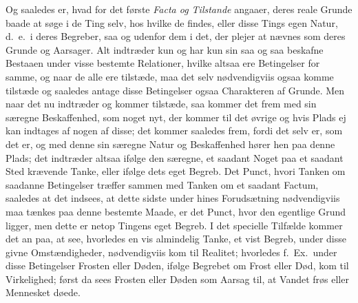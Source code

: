 \documentclass[12pt,a4paper]{book}
\newcommand{\apage}[1]{\marginnote{\footnotesize\textit{[#1]}}}
\begin{document}
Og saaledes er, hvad for det første \emph{Facta og Tilstande} angaaer, deres reale
Grunde baade at søge i de Ting selv, hos hvilke de findes, eller disse Tings egen
Natur, d.\ e.\ i deres Begreber, saa og udenfor dem i det, der plejer at nævnes
som deres Grunde og Aarsager. Alt indtræder kun og har kun sin saa og saa beskafne
Bestaaen under visse bestemte Relationer, hvilke altsaa ere Betingelser for samme,
og naar de alle ere tilstæde, maa det selv nødvendigviis ogsaa komme tilstæde og
saaledes antage disse Betingelser ogsaa Charakteren af Grunde. Men naar det nu
indtræder og kommer tilstæde, saa kommer det frem med sin særegne Beskaffenhed,
som noget nyt, der kommer til det øvrige og hvis Plads ej kan indtages af nogen af
disse; det kommer saaledes frem, fordi det selv er, som det er, og med denne sin
særegne Natur og Beskaffenhed hører hen paa denne Plads; det indtræder altsaa
ifølge den særegne, et saadant Noget paa et saadant Sted krævende Tanke, eller
ifølge dets eget Begreb. Det Punct, hvori Tanken om saadanne Betingelser træffer
sammen med Tanken om et saadant Factum, saaledes at det indsees, at dette sidste
under hines Forudsætning nødvendigviis maa tænkes paa denne bestemte Maade, er det
Punct, hvor den egentlige Grund ligger, men \apage{99} dette er netop Tingens eget Begreb. I
det specielle Tilfælde kommer det an paa, at see, hvorledes en vis almindelig
Tanke, et vist Begreb, under disse givne Omstændigheder, nødvendigviis kom til
Realitet; hvorledes f.~Ex.\ under disse Betingelser Frosten eller Døden, ifølge
Begrebet om Frost eller Død, kom til Virkelighed; først da sees Frosten eller
Døden som Aarsag til, at Vandet frøs eller Mennesket døede.
\end{document}
